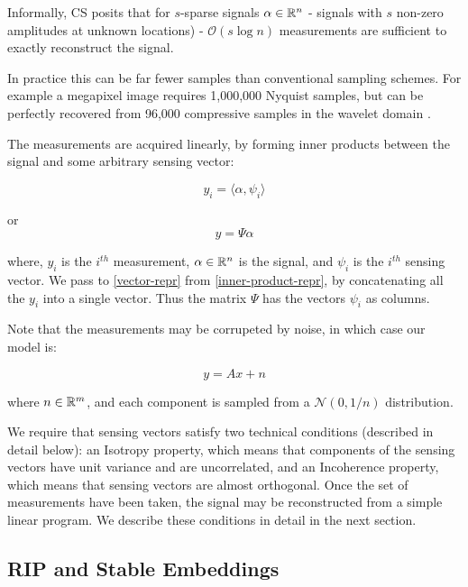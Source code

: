 Informally, CS posits that for \(s\)-sparse signals \(\alpha \in {\mathbb{R}}^{n}\) - signals with \(s\) non-zero amplitudes at unknown locations) - \(\mathcal{O}(s\log{n})\) measurements are sufficient to exactly reconstruct the signal.

In practice this can be far fewer samples than conventional sampling schemes. For example a megapixel image requires 1,000,000 Nyquist samples, but can be perfectly recovered from 96,000 compressive samples in the wavelet domain \cite{candes2008introduction}. 

The measurements are acquired linearly, by forming inner products between the signal and some arbitrary sensing vector:

\begin{equation}
y_i = \langle \alpha, \psi_i \rangle
\end{equation}
\label{inner-product-repr}

or \begin{equation}
y = \Psi \alpha
\end{equation}
\label{vector-repr}


where, \(y_i\) is the \(i^{th}\) measurement, \(\alpha \in {\mathbb{R}}^n\) is the signal, and \(\psi_i\) is the \(i^{th}\) sensing vector. We pass to \eqref{vector-repr} from \eqref{inner-product-repr}, by concatenating all the \(y_i\) into a single vector. Thus the matrix \(\Psi\) has the vectors \(\psi_i\) as columns.

Note that the measurements may be corrupeted by noise, in which case our model is:

\begin{equation}
y = Ax + n
\end{equation}
\label{CSequation}

where \(n \in {\mathbb{R}}^m\), and each component is sampled from a \(\mathcal{N}\left(0, 1/n\right)\) distribution.

We require that sensing vectors satisfy two technical conditions (described in detail below): an Isotropy property, which means that components of the sensing vectors have unit variance and are uncorrelated, and an Incoherence property, which means that sensing vectors are almost orthogonal. Once the set of measurements have been taken, the signal may be reconstructed from a simple linear program. We describe these conditions in detail in the next section.

\subsection{RIP and Stable Embeddings}

